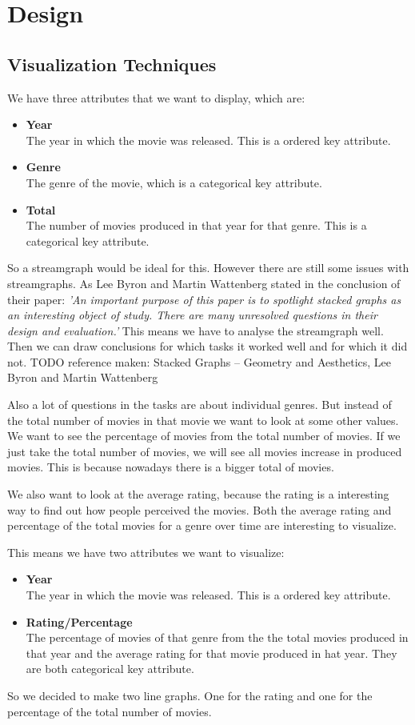 \section{Design}\label{Sec:Des}
	\subsection{Visualization Techniques}
	We have three attributes that we want to display, which are:
	\begin{itemize}
	\item \textbf{Year}\\
	The year in which the movie was released. This is a ordered key attribute.
	\item \textbf{Genre} \\
	The genre of the movie, which is a categorical key attribute. 
	\item \textbf{Total} \\
	The number of movies produced in that year for that genre. 
	This is a categorical key attribute.
	\end{itemize}
	So a streamgraph would be ideal for this. 
	However there are still some issues with streamgraphs. 
	As Lee Byron and Martin Wattenberg stated in the conclusion of their paper: 
	\emph{'An important purpose of this paper is to spotlight stacked graphs as an interesting object of study. 
	There are many unresolved questions in their design and evaluation.'}
	This means we have to analyse the streamgraph well. 
	Then we can draw conclusions for which tasks it worked well and for which it did not. 
	TODO reference maken: Stacked Graphs – Geometry and Aesthetics, Lee Byron and Martin Wattenberg

	Also a lot of questions in the tasks are about individual genres. 
	But instead of the total number of movies in that movie we want to look at some other values.
	We want to see the percentage of movies from the total number of movies.
	If we just take the total number of movies, we will see all movies increase in produced movies. 
	This is because nowadays there is a bigger total of movies.
	
	We also want to look at the average rating, because the rating is a interesting way to find out how people perceived the movies. 
	Both the average rating and percentage of the total movies for a genre over time are interesting to visualize. 
	
	This means we have two attributes we want to visualize: 
	\begin{itemize}
	\item \textbf{Year}\\
	The year in which the movie was released. This is a ordered key attribute.
	\item \textbf{Rating/Percentage} \\
	The percentage of movies of that genre from the the total movies produced in that year and the average rating for that movie produced in hat year.
	They are both categorical key attribute.
	\end{itemize}
	So we decided to make two line graphs. 
	One for the rating and one for the percentage of the total number of movies.
	
